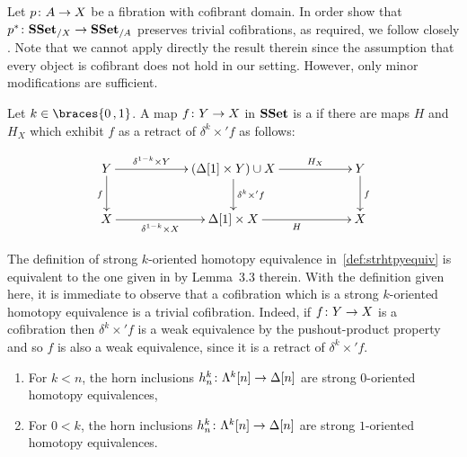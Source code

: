 \documentclass[reqno,10pt,a4paper,oneside,draft]{amsart}
\begin{document}
Let $p \colon A \rightarrow X$ be a fibration with cofibrant domain. In order show that $p^* \colon \mathbf{SSet}_{/X} \to \mathbf{SSet}_{/A}$ preserves 
trivial cofibrations, as required,  we follow closely \cite[Section~3]{gambino2017frobenius}. Note that we cannot apply directly the result therein since 
the assumption that every object is cofibrant does not hold in our setting. However, only minor modifications are sufficient.




\begin{definition} \label{def:strhtpyequiv} Let $k \in \braces{0 \, , 1 }$.
A map $f \colon Y \rightarrow X$ in $\mathbf{SSet}$ is a  if there are maps $H$ and $H_X$ which exhibit $f$ as a retract of $\delta^k \times ' f$ as follows:

\[
\xymatrix@C=2cm{
Y \ar[d]_{f} \ar[r]^-{\delta^{1-k} \times Y} & 
( \Delta[1] \times Y ) \cup X \ar[d]^{\delta^k \times' f} \ar[r]^-{H_X} & 
Y \ar[d]^{f} \\
X \ar[r]_-{\delta^{1-k} \times X}  & 
\Delta[1] \times X \ar[r]_{H} &
X  }
\]
\end{definition}

\begin{remark} \label{rem:below-strhtpyequiv}
The definition of strong $k$-oriented homotopy equivalence in~\cref{def:strhtpyequiv} is equivalent to the one given in \cite{gambino2017frobenius} by Lemma~3.3 therein.
With the definition given here, it is immediate to observe that a cofibration which is a strong $k$-oriented homotopy equivalence is a trivial cofibration. Indeed, if $f \colon Y \to X$ is a cofibration then $\delta^k \times ' f$ is 
a weak equivalence by the pushout-product property and so $f$ is also a weak equivalence, since it is a retract of $\delta^k \times ' f$.
\end{remark}

\begin{lemma}\label{lemma:genTcof_strongHequiv} \hfill 
\begin{enumerate}[$(i)$]
\item For $k < n$, the horn inclusions $h_n^k \colon \Lambda^k[n] \rightarrow \Delta[n]$ are strong $0$-oriented homotopy equivalences,
\item For $0 < k$, the horn inclusions $h_n^k \colon \Lambda^k[n] \rightarrow \Delta[n]$ are strong $1$-oriented homotopy equivalences.
\end{enumerate}
\end{lemma}
\end{document}
